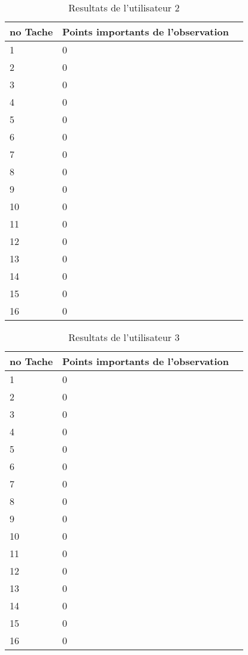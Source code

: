 \documentclass[letterpaper, oneside, 12pt, these, creativecommons]{thETS}
\begin{document}
\begin{table}
	\centering
	\begin{tabular}{|l|l|l|}
	\hline
	no Tache	& Points importants de l'observation	\\ \hline
	1		& 0						\\ \hline
	2		& 0						\\ \hline
	3		& 0						\\ \hline
	4		& 0						\\ \hline
	5		& 0						\\ \hline
	6		& 0						\\ \hline
	7		& 0						\\ \hline
	8		& 0						\\ \hline
	9		& 0						\\ \hline
	10		& 0						\\ \hline
	11		& 0						\\ \hline
	12		& 0						\\ \hline
	13		& 0						\\ \hline
	14		& 0						\\ \hline
	15		& 0						\\ \hline
	16		& 0						\\ \hline
	\end{tabular}
	\caption{Resultats de l'utilisateur 2}
\end{table}

\newpage

\begin{table}
	\centering
	\begin{tabular}{|l|l|l|}
	\hline
	no Tache	& Points importants de l'observation	\\ \hline
	1		& 0						\\ \hline
	2		& 0						\\ \hline
	3		& 0						\\ \hline
	4		& 0						\\ \hline
	5		& 0						\\ \hline
	6		& 0						\\ \hline
	7		& 0						\\ \hline
	8		& 0						\\ \hline
	9		& 0						\\ \hline
	10		& 0						\\ \hline
	11		& 0						\\ \hline
	12		& 0						\\ \hline
	13		& 0						\\ \hline
	14		& 0						\\ \hline
	15		& 0						\\ \hline
	16		& 0						\\ \hline
	\end{tabular}
	\caption{Resultats de l'utilisateur 3}
\end{table}
\end{document}
